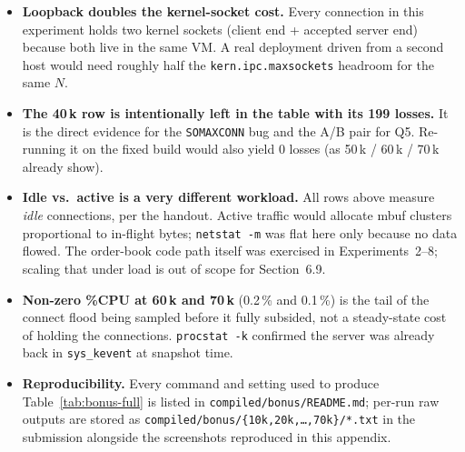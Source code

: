\documentclass[11pt,a4paper]{article}
\begin{document}
\begin{itemize}[leftmargin=1.5em,itemsep=0.2em]
  \item \textbf{Loopback doubles the kernel-socket cost.} Every connection
        in this experiment holds two kernel sockets (client end + accepted
        server end) because both live in the same VM.  A real deployment
        driven from a second host would need roughly half the
        \texttt{kern.ipc.maxsockets} headroom for the same $N$.
  \item \textbf{The 40\,k row is intentionally left in the table with its
        199 losses.}  It is the direct evidence for the
        \texttt{SOMAXCONN} bug and the A/B pair for Q5.  Re-running it on
        the fixed build would also yield 0 losses (as 50\,k / 60\,k / 70\,k
        already show).
  \item \textbf{Idle vs.\ active is a very different workload.}  All rows
        above measure \emph{idle} connections, per the handout.  Active
        traffic would allocate mbuf clusters proportional to
        in-flight bytes; \texttt{netstat -m} was flat here only because no
        data flowed.  The order-book code path itself was exercised in
        Experiments~2--8; scaling that under load is out of scope for
        Section~6.9.
  \item \textbf{Non-zero \%CPU at 60\,k and 70\,k} (0.2\,\% and 0.1\,\%) is
        the tail of the connect flood being sampled before it fully
        subsided, not a steady-state cost of holding the connections.
        \texttt{procstat -k} confirmed the server was already back in
        \texttt{sys\_kevent} at snapshot time.
  \item \textbf{Reproducibility.}  Every command and setting used to
        produce Table~\ref{tab:bonus-full} is listed in
        \texttt{compiled/bonus/README.md}; per-run raw outputs are stored
        as \texttt{compiled/bonus/\{10k,20k,\dots,70k\}/*.txt} in the
        submission alongside the screenshots reproduced in this appendix.
\end{itemize}
\end{document}
